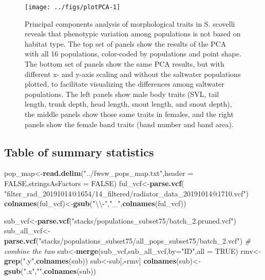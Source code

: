 \documentclass[11pt,]{article}
\newenvironment{Shaded}{\begin{snugshade}}{\end{snugshade}}
\newcommand{\KeywordTok}[1]{\textcolor[rgb]{0.13,0.29,0.53}{\textbf{#1}}}
\newcommand{\DataTypeTok}[1]{\textcolor[rgb]{0.13,0.29,0.53}{#1}}
\newcommand{\CharTok}[1]{\textcolor[rgb]{0.31,0.60,0.02}{#1}}
\newcommand{\StringTok}[1]{\textcolor[rgb]{0.31,0.60,0.02}{#1}}
\newcommand{\CommentTok}[1]{\textcolor[rgb]{0.56,0.35,0.01}{\textit{#1}}}
\newcommand{\OtherTok}[1]{\textcolor[rgb]{0.56,0.35,0.01}{#1}}
\newcommand{\OperatorTok}[1]{\textcolor[rgb]{0.81,0.36,0.00}{\textbf{#1}}}
\newcommand{\NormalTok}[1]{#1}
\begin{document}
\begin{figure}[H]
\texttt{[image: ../figs/plotPCA-1]} \caption{Principal components analysis of morphological traits in S. scovelli reveals that phenotypic variation among populations is not based on habitat type. The top set of panels show the results of the PCA with all 16 populations, color-coded by populations and point shape. The bottom set of panels show the same PCA results, but with different x- and y-axis scaling and without the saltwater populations plotted, to facilitate visualizing the differences among saltwater populations. The left panels show male body traits (SVL, tail length, trunk depth, head length, snout length, and snout depth), the middle panels show those same traits in females, and the right panels show the female band traits (band number and band area).}\label{fig:plotPCA}
\end{figure}

\subsection{Table of summary
statistics}\label{table-of-summary-statistics}

\begin{Shaded}
\begin{Highlighting}[]
\NormalTok{pop_map<-}\KeywordTok{read.delim}\NormalTok{(}\StringTok{"../fwsw_pops_map.txt"}\NormalTok{,}\DataTypeTok{header =} \OtherTok{FALSE}\NormalTok{,}\DataTypeTok{stringsAsFactors =} \OtherTok{FALSE}\NormalTok{)}
\NormalTok{ful_vcf<-}\KeywordTok{parse.vcf}\NormalTok{(}
  \StringTok{"filter_rad_20191014@1654/14_filtered/radiator_data_20191014@1710.vcf"}\NormalTok{)}
\KeywordTok{colnames}\NormalTok{(ful_vcf)<-}\KeywordTok{gsub}\NormalTok{(}\StringTok{"}\CharTok{\textbackslash{}\textbackslash{}}\StringTok{-"}\NormalTok{,}\StringTok{"_"}\NormalTok{,}\KeywordTok{colnames}\NormalTok{(ful_vcf))}
\end{Highlighting}
\end{Shaded}

\begin{Shaded}
\begin{Highlighting}[]
\NormalTok{sub_vcf<-}\KeywordTok{parse.vcf}\NormalTok{(}\StringTok{"stacks/populations_subset75/batch_2.pruned.vcf"}\NormalTok{)}
\NormalTok{sub_all_vcf<-}\KeywordTok{parse.vcf}\NormalTok{(}\StringTok{"stacks/populations_subset75/all_pops_subset75/batch_2.vcf"}\NormalTok{)}
\CommentTok{# combine the two}
\NormalTok{sub<-}\KeywordTok{merge}\NormalTok{(sub_vcf,sub_all_vcf,}\DataTypeTok{by=}\StringTok{"ID"}\NormalTok{,}\DataTypeTok{all =} \OtherTok{TRUE}\NormalTok{)}
\NormalTok{rmv<-}\KeywordTok{grep}\NormalTok{(}\StringTok{".y"}\NormalTok{,}\KeywordTok{colnames}\NormalTok{(sub))}
\NormalTok{sub<-sub[,}\OperatorTok{-}\NormalTok{rmv]}
\KeywordTok{colnames}\NormalTok{(sub)<-}\KeywordTok{gsub}\NormalTok{(}\StringTok{".x"}\NormalTok{,}\StringTok{""}\NormalTok{,}\KeywordTok{colnames}\NormalTok{(sub))}
\end{Highlighting}
\end{Shaded}
\end{document}
